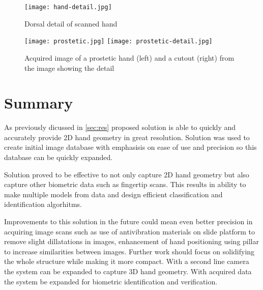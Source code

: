\documentclass[11pt,a4paper]{article}
\begin{document}
\begin{figure}[ht!]
    \label{fig:hand-detail}
    \centering
    \texttt{[image: hand-detail.jpg]}
    \caption{Dorsal detail of scanned hand}
\end{figure}

\begin{figure}[ht!]
    \label{fig:prostetic-detail}
    \centering
    \texttt{[image: prostetic.jpg]}
    \texttt{[image: prostetic-detail.jpg]}
    \caption{Acquired image of a prostetic hand (left) and a cutout (right) from the image showing the detail}
\end{figure}

\section{Summary}
\label{sec:sum}
As previously dicussed in \ref{sec:res} proposed solution is able to quickly and accurately provide 2D hand geometry in great resolution. Solution was
used to create initial image database with emphasisis on ease of use and precision so this database can be quickly expanded.

Solution proved to be effective to not only capture 2D hand geometry but also capture other biometric data such as fingertip scans. This results in
ability to make multiple models from data and design efficient classification and identification algorhitms.

Improvements to this solution in the future could mean even better precision in acquiring image scans such as use of antivibration materials on
slide platform to remove slight dillatations in images, enhancement of hand positioning using pillar to increase similarities between images.
Further work should focus on solidifying the whole structure while making it more compact.
With a second line camera the system can be expanded to capture 3D hand geometry. With acquired data the system be expanded for biometric identification and verification.
\end{document}
